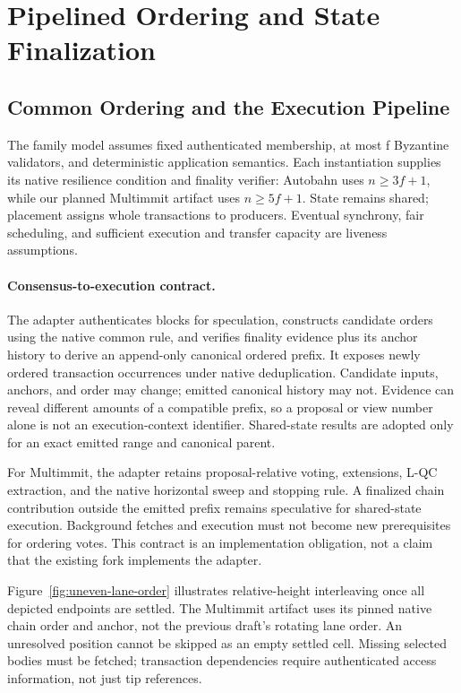 \section{Pipelined Ordering and State Finalization}
\label{sec:design}

\subsection{Common Ordering and the Execution Pipeline}

The family model assumes fixed authenticated membership, at most f Byzantine validators, and deterministic application semantics. Each instantiation supplies its native resilience condition and finality verifier: Autobahn uses \(n\geq3f+1\), while our planned Multimmit artifact uses \(n\geq5f+1\). State remains shared; placement assigns whole transactions to producers. Eventual synchrony, fair scheduling, and sufficient execution and transfer capacity are liveness assumptions.

\paragraph{Consensus-to-execution contract.}
The adapter authenticates blocks for speculation, constructs candidate orders using the native common rule, and verifies finality evidence plus its anchor history to derive an append-only canonical ordered prefix. It exposes newly ordered transaction occurrences under native deduplication. Candidate inputs, anchors, and order may change; emitted canonical history may not. Evidence can reveal different amounts of a compatible prefix, so a proposal or view number alone is not an execution-context identifier. Shared-state results are adopted only for an exact emitted range and canonical parent.

For Multimmit, the adapter retains proposal-relative voting, extensions, L-QC extraction, and the native horizontal sweep and stopping rule. A finalized chain contribution outside the emitted prefix remains speculative for shared-state execution. Background fetches and execution must not become new prerequisites for ordering votes. This contract is an implementation obligation, not a claim that the existing fork implements the adapter. \citep{multimmit}

Figure~\ref{fig:uneven-lane-order} illustrates relative-height interleaving once all depicted endpoints are settled. The Multimmit artifact uses its pinned native chain order and anchor, not the previous draft's rotating lane order. An unresolved position cannot be skipped as an empty settled cell. Missing selected bodies must be fetched; transaction dependencies require authenticated access information, not just tip references.


